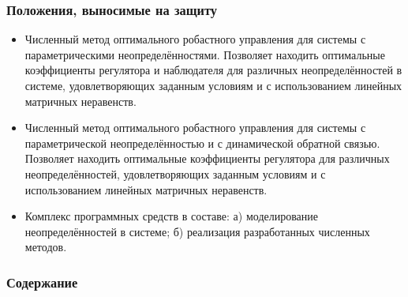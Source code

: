 \begin{frame}
    \setcounter{framenumber}{1}
    \maketitle
\end{frame}

\begin{frame}
    \frametitle{Положения, выносимые на защиту}
    \begin{itemize}
        \item Численный метод оптимального робастного управления для системы с параметрическими неопределённостями. Позволяет находить оптимальные коэффициенты регулятора и наблюдателя для различных неопределённостей в системе, удовлетворяющих заданным условиям и с использованием линейных матричных неравенств.
        \item Численный метод оптимального робастного управления для системы с параметрической неопределённостью и с динамической обратной связью. Позволяет находить оптимальные коэффициенты регулятора для различных неопределённостей, удовлетворяющих заданным условиям и с использованием линейных матричных неравенств.
        \item Комплекс программных средств в составе: а) моделирование неопределённостей в системе; б) реализация разработанных численных методов.
    \end{itemize}
\end{frame}

\begin{frame}
    \frametitle{Содержание}
    \tableofcontents
\end{frame}
